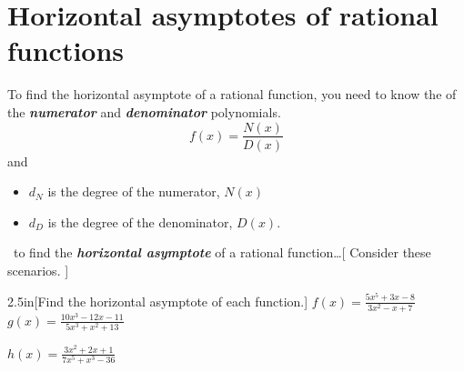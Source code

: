 \section{Horizontal asymptotes of rational functions}

To find the horizontal asymptote of a rational function,
you need to know the  of the {\bfseries\itshape numerator} and {\bfseries\itshape denominator} polynomials.
\[ f(x) = \frac{N(x)}{D(x)} \]
and
\vspace{-0.5em}
\begin{itemize}[nosep]
    \item $d_N$ is the degree of the numerator, $N(x)$
    \item $d_D$ is the degree of the denominator, $D(x)$.
\end{itemize}
\vspace{1em}

\begin{myConceptSteps}{~to find the {\bfseries\itshape horizontal asymptote} of a rational function\dots}[%
        Consider these scenarios.
    ]
\end{myConceptSteps}

\begin{my2Problems}{2.5in}[Find the horizontal asymptote of each function.]
    {
        $f(x) = \frac{5x^5 + 3x -8}{3x^2-x+7}$
    }
    {
        $g(x) = \frac{10x^3 - 12x - 11}{5x^3 + x^2  + 13}$
    }
\end{my2Problems}
\begin{myProblem}{2.5in}
    {
        $h(x) = \frac{3x^2 + 2x + 1}{7x^5 + x^3-36}$
    }
\end{myProblem}
